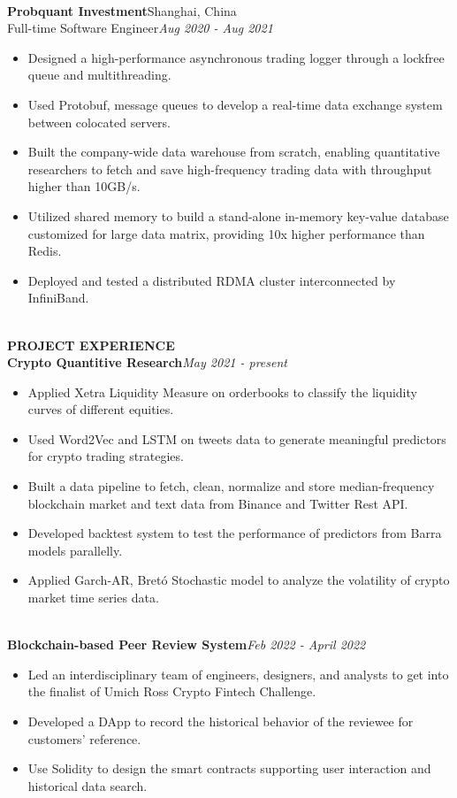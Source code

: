 \documentclass[10pt,a4paper]{article}
\begin{document}
\noindent\\
\textbf{Probquant Investment}\hfill Shanghai, China\\
Full-time Software Engineer\hfill\emph{Aug 2020 - Aug 2021}
\begin{itemize}[noitemsep,topsep=0pt]
    \item Designed a high-performance asynchronous trading logger through a lockfree queue and multithreading.
    \item Used Protobuf, message queues to develop a real-time data exchange system between colocated servers.
    \item Built the company-wide data warehouse from scratch, enabling quantitative researchers to fetch and save high-frequency trading data with throughput higher than 10GB/s.
    \item Utilized shared memory to build a stand-alone in-memory key-value database customized for large data matrix, providing 10x higher performance than Redis.
    \item Deployed and tested a distributed RDMA cluster interconnected by InfiniBand.
\end{itemize}
\noindent\\
\rlap{\rule[-1mm]{\linewidth}{.5mm}}\textbf{\large{PROJECT EXPERIENCE}}\\
\textbf{Crypto Quantitive Research}\hfill \emph{May 2021 - present}
\begin{itemize}[noitemsep,topsep=0pt]
    \item Applied Xetra Liquidity Measure on orderbooks to classify the liquidity curves of different equities.
    \item Used Word2Vec and LSTM on tweets data to generate meaningful predictors for crypto trading strategies.
    \item Built a data pipeline to fetch, clean, normalize and store median-frequency blockchain market and text data from Binance and Twitter Rest API.
    \item Developed backtest system to test the performance of predictors from Barra models parallelly.
    \item Applied Garch-AR, Bretó Stochastic model to analyze the volatility of crypto market time series data.
\end{itemize}
\noindent\\
\textbf{Blockchain-based Peer Review System}\hfill\emph{Feb 2022 - April 2022}
\begin{itemize}[noitemsep,topsep=0pt]
    \item Led an interdisciplinary team of engineers, designers, and analysts to get into the finalist of Umich Ross Crypto Fintech Challenge.
    \item Developed a DApp to record the historical behavior of the reviewee for customers' reference.
    \item Use Solidity to design the smart contracts supporting user interaction and historical data search.
\end{itemize}
\end{document}
